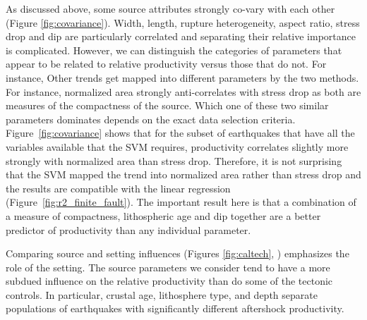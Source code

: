 \documentclass[draft, jgrga]{agujournal2018}
\begin{document}
As discussed above, some source attributes strongly co-vary with each other (Figure \ref{fig:covariance}). Width, length, rupture heterogeneity, aspect ratio, stress drop and dip are particularly correlated and separating their relative importance is complicated. However, we can distinguish the categories of parameters that appear to be related to relative productivity versus those that do not. For instance,  Other trends get mapped into different parameters by the two methods. For instance, normalized area strongly anti-correlates with stress drop as both are measures of the compactness of the source. Which one of these two similar parameters dominates depends on the exact data selection criteria. Figure~\ref{fig:covariance} shows that for the subset of earthquakes that have all the variables available that the SVM requires, productivity correlates slightly more strongly with normalized area than stress drop. Therefore, it is not surprising that the SVM mapped the trend into normalized area rather than stress drop and the results are compatible with the linear regression (Figure~\ref{fig:r2_finite_fault}). The important result here is that a combination of a measure of compactness, lithospheric age and dip together are a better predictor of productivity than any individual parameter. 


Comparing source and setting influences (Figures \ref{fig:caltech}, ) emphasizes the role of the setting. The source parameters we consider tend to have a more subdued influence on the relative productivity than do some of the tectonic controls. In particular, crustal age, lithosphere type, and depth separate populations of earthquakes with significantly different aftershock productivity.
\end{document}
